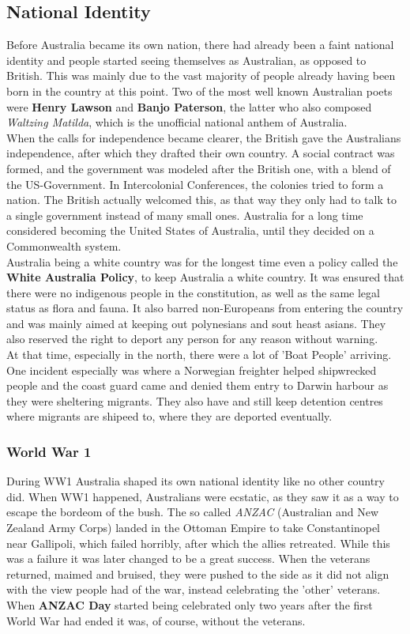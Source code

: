 \documentclass{article}
\begin{document}
	\subsection{National Identity}
	Before Australia became its own nation, there had already been a faint national identity and people started seeing themselves as Australian, as opposed to British. This was mainly due to the vast majority of people already having been born in the country at this point. Two of the most well known Australian poets were \textbf{Henry Lawson} and \textbf{Banjo Paterson}, the latter who also composed \textit{Waltzing Matilda}, which is the unofficial national anthem of Australia. \\
	When the calls for independence became clearer, the British gave the Australians independence, after which they drafted their own country. A social contract was formed, and the government was modeled after the British one, with a blend of the US-Government. In Intercolonial Conferences, the colonies tried to form a nation. The British actually welcomed this, as that way they only had to talk to a single government instead of many small ones. Australia for a long time considered becoming the United States of Australia, until they decided on a Commonwealth system. \\
	Australia being a white country was for the longest time even a policy called the \textbf{White Australia Policy}, to keep Australia a white country. It was ensured that there were no indigenous people in the constitution, as well as the same legal status as flora and fauna. It also barred non-Europeans from entering the country and was mainly aimed at keeping out polynesians and sout heast asians. They also reserved the right to deport any person for any reason without warning. \\
	At that time, especially in the north, there were a lot of 'Boat People' arriving. One incident especially was where a Norwegian freighter helped shipwrecked people and the coast guard came and denied them entry to Darwin harbour as they were sheltering migrants. They also have and still keep detention centres where migrants are shipeed to, where they are deported eventually. \\
	\subsubsection{World War 1}
	During WW1 Australia shaped its own national identity like no other country did. When WW1 happened, Australians were ecstatic, as they saw it as a way to escape the bordeom of the bush. The so called \textit{ANZAC} (Australian and New Zealand Army Corps) landed in the Ottoman Empire to take Constantinopel near Gallipoli, which failed horribly, after which the allies retreated. While this was a failure it was later changed to be a great success. When the veterans returned, maimed and bruised, they were pushed to the side as it did not align with the view people had of the war, instead celebrating the 'other' veterans. When \textbf{ANZAC Day} started being celebrated only two years after the first World War had ended it was, of course, without the veterans. \\
\end{document}
